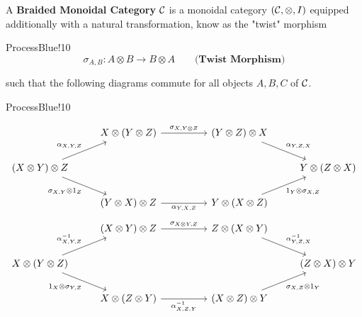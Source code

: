 \begin{definition}
A \textbf{Braided Monoidal Category} $\mathcal{C}$ is a monoidal 
category $(\mathcal{C}, \otimes, I)$ equipped additionally with a natural transformation, 
know as the "twist" morphism
\begin{statement}{ProcessBlue!10}
    \[
        \sigma_{A,B}: A\otimes B \to B\otimes A\qquad \textbf{(Twist Morphism)}
    \] 
\end{statement} 
    such that the following diagrams commute for all objects $A, B, C$ of $\mathcal{C}$. 
\begin{statement}{ProcessBlue!10}
    \begin{center}
        \begin{equation}\label{diagram:braidedhex1}
            \begin{tikzcd}
            &
            X \otimes (Y \otimes Z) 
            \arrow[r, "\sigma_{X, Y\otimes Z}"]
            &[0.8cm]
            (Y \otimes Z) \otimes X
            \arrow[dr, "\alpha_{Y, Z, X}"]
            &
            \\
            (X \otimes Y)\otimes Z
            \arrow[ur, "\alpha_{X, Y, Z}"]
            \arrow[dr, swap, "\sigma_{X, Y} \otimes 1_Z"]
            &
            &
            &
            Y \otimes (Z \otimes X)
            \\
            &
            (Y \otimes X) \otimes Z
            \arrow[r, swap, "\alpha_{Y, X, Z}"]
            &
            Y \otimes (X \otimes Z)
            \arrow[ur, swap, "1_Y \otimes \sigma_{X, Z}"]
            &
        \end{tikzcd}
        \end{equation}
        \begin{equation}\label{diagram:braidedhex2}
            \begin{tikzcd}
            &
            (X\otimes Y) \otimes Z
            \arrow[r, "\sigma_{X\otimes Y, Z}"]
            &[0.8cm]
            Z \otimes (X\otimes Y)
            \arrow[dr, "\alpha^{-1}_{Y, Z, X}"]
            &
            \\
            X\otimes (Y\otimes Z)
            \arrow[ur, "\alpha^{-1}_{X, Y, Z}"]
            \arrow[dr, swap, "1_X \otimes \sigma_{Y,Z}"]
            &
            &
            &
            (Z\otimes X) \otimes Y
            \\
            &
            X\otimes(Z \otimes Y)
            \arrow[r, swap, "\alpha^{-1}_{X, Z, Y}"]
            &
            (X \otimes Z) \otimes Y
            \arrow[ur, swap,  "\sigma_{X, Z} \otimes 1_Y"]
            &
            \end{tikzcd}
        \end{equation} 
    \end{center}
\end{statement}
\end{definition}

